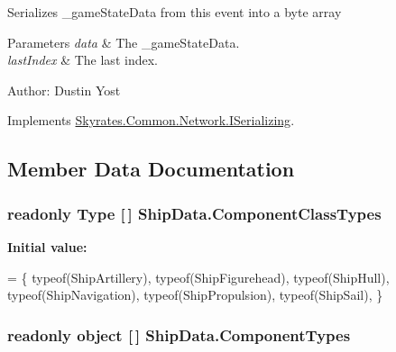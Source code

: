 Serializes \-\_\-game\-State\-Data from this event into a byte array 


\begin{DoxyParams}{Parameters}
{\em data} & The \-\_\-game\-State\-Data.\\
\hline
{\em last\-Index} & The last index.\\
\hline
\end{DoxyParams}


Author\-: Dustin Yost 

Implements \hyperlink{interface_skyrates_1_1_common_1_1_network_1_1_i_serializing_a1433635010dc809984bb621d857f9489}{Skyrates.\-Common.\-Network.\-I\-Serializing}.



\subsection{Member Data Documentation}
\hypertarget{class_ship_data_a725a1caabab53787c0f5ea3e4f71b9cf}{
\subsubsection[{Component\-Class\-Types}]{\setlength{\rightskip}{0pt plus 5cm}readonly Type \mbox{[}$\,$\mbox{]} Ship\-Data.\-Component\-Class\-Types\hspace{0.3cm}{\ttfamily [static]}}}\label{class_ship_data_a725a1caabab53787c0f5ea3e4f71b9cf}
{\bfseries Initial value\-:}
\begin{DoxyCode}
=
    \{
        typeof(ShipArtillery),
        typeof(ShipFigurehead),
        typeof(ShipHull),
        typeof(ShipNavigation),
        typeof(ShipPropulsion),
        typeof(ShipSail),
    \}
\end{DoxyCode}
\hypertarget{class_ship_data_a47c222837040afdb00f4363070b5d8df}{
\subsubsection[{Component\-Types}]{\setlength{\rightskip}{0pt plus 5cm}readonly object \mbox{[}$\,$\mbox{]} Ship\-Data.\-Component\-Types\hspace{0.3cm}{\ttfamily [static]}}}\label{class_ship_data_a47c222837040afdb00f4363070b5d8df}
